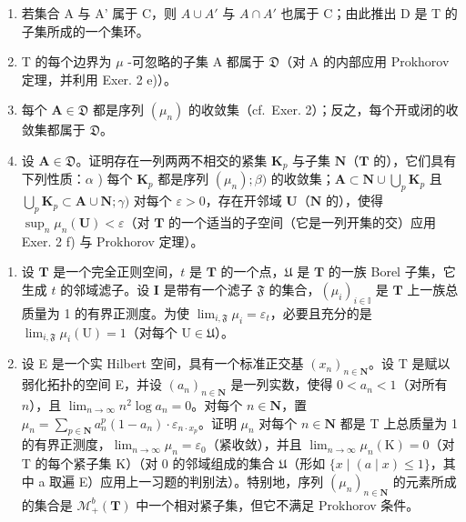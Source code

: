 \begin{enumerate}
\def\labelenumi{\alph{enumi})}
\item
  若集合 A 与 A' 属于 C，则 \(A \cup A'\) 与 \(A \cap A'\) 也属于 C；由此推出 D 是 T 的子集所成的一个集环。
\item
  T 的每个边界为 \(\mu\) -可忽略的子集 A 都属于 \(\mathfrak{D}\)（对 A 的内部应用 Prokhorov 定理，并利用 Exer. 2 e)）。
\item
  每个 \(\mathbf{A} \in \mathfrak{D}\) 都是序列 \((\mu_n)\) 的收敛集（cf.~Exer. 2）；反之，每个开或闭的收敛集都属于 \(\mathfrak{D}\)。
\item
  设 \(\mathbf{A} \in \mathfrak{D}\)。证明存在一列两两不相交的紧集 \(\mathbf{K}_p\) 与子集 \(\mathbf{N}\)（\(\mathbf{T}\) 的），它们具有下列性质：\(\alpha\) ) 每个 \(\mathbf{K}_p\) 都是序列 \((\mu_n); \beta)\) 的收敛集；\(\mathbf{A} \subset \mathbf{N} \cup \bigcup_{p} \mathbf{K}_p\) 且 \(\bigcup_{p} \mathbf{K}_p \subset \mathbf{A} \cup \mathbf{N}; \gamma)\) 对每个 \(\varepsilon > 0\)，存在开邻域 \(\mathbf{U}\)（\(\mathbf{N}\) 的），使得 \(\sup_{n}\mu_n(\mathbf{U}) < \varepsilon\)（对 \(\mathbf{T}\) 的一个适当的子空间（它是一列开集的交）应用 Exer. 2 f) 与 Prokhorov 定理）。
\end{enumerate}

\begin{enumerate}
\def\labelenumi{\arabic{enumi})}
\setcounter{enumi}{3}
\item
  设 \(\mathbf{T}\) 是一个完全正则空间，\(t\) 是 \(\mathbf{T}\) 的一个点，\(\mathfrak{U}\) 是 \(\mathbf{T}\) 的一族 Borel 子集，它生成 \(t\) 的邻域滤子。设 \(\mathbf{I}\) 是带有一个滤子 \(\mathfrak{F}\) 的集合，\((\mu_i)_{i \in \mathbb{I}}\) 是 \(\mathbf{T}\) 上一族总质量为 1 的有界正测度。为使 \(\lim_{i, \mathfrak{F}} \mu_i = \varepsilon_t\)，必要且充分的是 \(\lim_{i, \mathfrak{F}} \mu_i(\mathrm{U}) = 1\)（对每个 \(\mathrm{U} \in \mathfrak{U}\)）。
\item
  设 E 是一个实 Hilbert 空间，具有一个标准正交基 \((x_{n})_{n\in \mathbf{N}}\)。设 T 是赋以弱化拓扑的空间 E，并设 \((a_{n})_{n\in \mathbf{N}}\) 是一列实数，使得 \(0 < a_{n} < 1\)（对所有 \(n\)），且 \(\lim_{n\to \infty}n^2\log a_n = 0\)。对每个 \(n\in \mathbf{N}\)，置 \(\mu_{n} = \sum_{p\in \mathbf{N}}a_{n}^{p}(1 - a_{n})\cdot \varepsilon_{n\cdot x_{p}}\)。证明 \(\mu_{n}\) 对每个 \(n \in \mathbf{N}\) 都是 T 上总质量为 1 的有界正测度，\(\lim_{n\to\infty}\mu_{n}=\varepsilon_{0}\)（紧收敛），并且 \(\lim_{n\to\infty}\mu_{n}(\mathrm{K})=0\)（对 T 的每个紧子集 \(\mathrm{K}\)）（对 0 的邻域组成的集合 \(\mathfrak{U}\)（形如 \(\{x \mid (a \mid x) \leqslant 1\}\)，其中 a 取遍 E）应用上一习题的判别法）。特别地，序列 \((\mu_{n})_{n \in \mathbf{N}}\) 的元素所成的集合是 \(\mathcal{M}_{+}^{b}(\mathbf{T})\) 中一个相对紧子集，但它不满足 Prokhorov 条件。
\end{enumerate}


